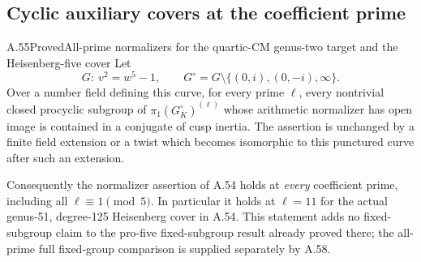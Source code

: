 \subsection{Cyclic auxiliary covers at the coefficient prime}

\begin{statement}{A.55}{Proved}{All-prime normalizers for the quartic-CM genus-two target and the Heisenberg-five cover}
Let
\[
 G:\ v^2=w^5-1,
 \qquad G^\circ=G\setminus\{(0,i),(0,-i),\infty\}.
                                                        \tag{A.55.1}
\]
Over a number field defining this curve, for every prime \(\ell\),
every nontrivial closed procyclic subgroup of
\(\pi_1(G^\circ_{\overline K})^{(\ell)}\) whose arithmetic
normalizer has open image is contained in a conjugate of cusp inertia.
The assertion is unchanged by a finite field extension or a twist
which becomes isomorphic to this punctured curve after such an extension.

Consequently the normalizer assertion of A.54 holds at \emph{every}
coefficient prime, including all \(\ell\equiv1\pmod5\). In particular
it holds at \(\ell=11\) for the actual genus-51, degree-125
Heisenberg cover in A.54. This statement adds no fixed-subgroup
claim to the pro-five fixed-subgroup result already proved there;
the all-prime full fixed-group comparison is supplied separately by A.58.
\end{statement}
